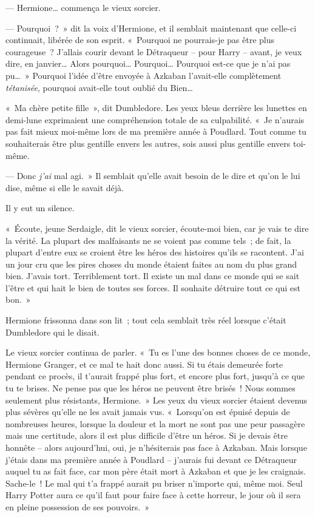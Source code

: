 --- Hermione… commença le vieux sorcier.

--- Pourquoi~?~» dit la voix d'Hermione, et il semblait maintenant que celle-ci continuait, libérée de son esprit. «~Pourquoi ne pourrais-je pas être plus courageuse~? J'allais courir devant le Détraqueur -- pour Harry -- avant, je veux dire, en janvier… Alors pourquoi… Pourquoi… Pourquoi est-ce que je n'ai pas pu…~» Pourquoi l'idée d'être envoyée à Azkaban l'avait-elle complètement \emph{tétanisée}, pourquoi avait-elle tout oublié du Bien…

«~Ma chère petite fille~», dit Dumbledore. Les yeux bleus derrière les lunettes en demi-lune exprimaient une compréhension totale de sa culpabilité. «~Je n'aurais pas fait mieux moi-même lors de ma première année à Poudlard. Tout comme tu souhaiterais être plus gentille envers les autres, sois aussi plus gentille envers toi-même.

--- Donc \emph{j'ai} mal agi.~» Il semblait qu'elle avait besoin de le dire et qu'on le lui dise, même si elle le savait déjà.

Il y eut un silence.

«~Écoute, jeune Serdaigle, dit le vieux sorcier, écoute-moi bien, car je vais te dire la vérité. La plupart des malfaisants ne se voient pas comme tels~; de fait, la plupart d'entre eux se croient être les héros des histoires qu'ils se racontent. J'ai un jour cru que les pires choses du monde étaient faites au nom du plus grand bien. J'avais tort. Terriblement tort. Il existe un mal dans ce monde qui se sait l'être et qui hait le bien de toutes ses forces. Il souhaite détruire tout ce qui est bon.~»

Hermione frissonna dans son lit~; tout cela semblait très réel lorsque c'était Dumbledore qui le disait.

Le vieux sorcier continua de parler. «~Tu es l'une des bonnes choses de ce monde, Hermione Granger, et ce mal te hait donc aussi. Si tu étais demeurée forte pendant ce procès, il t'aurait frappé plus fort, et encore plus fort, jusqu'à ce que tu te brises. Ne pense pas que les héros ne peuvent être brisés~! Nous sommes seulement plus résistants, Hermione.~» Les yeux du vieux sorcier étaient devenus plus sévères qu'elle ne les avait jamais vus. «~Lorsqu'on est épuisé depuis de nombreuses heures, lorsque la douleur et la mort ne sont pas une peur passagère mais une certitude, alors il est plus difficile d'être un héros. Si je devais être honnête -- alors aujourd'hui, oui, je n'hésiterais pas face à Azkaban. Mais lorsque j'étais dans ma première année à Poudlard -- j'aurais fui devant ce Détraqueur auquel tu as fait face, car mon père était mort à Azkaban et que je les craignais. Sache-le~! Le mal qui t'a frappé aurait pu briser n'importe qui, même moi. Seul Harry Potter aura ce qu'il faut pour faire face à cette horreur, le jour où il sera en pleine possession de ses pouvoirs.~»

